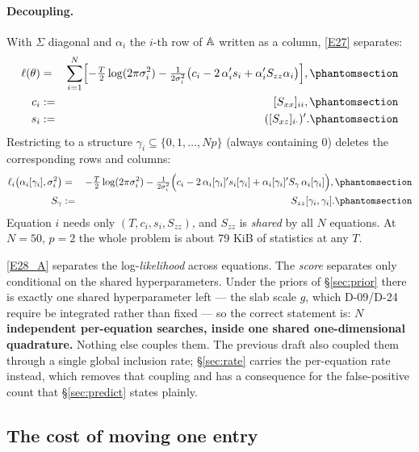 \paragraph{Decoupling.} With $\Sigma$ diagonal and $\alpha_i$ the $i$-th row of $\mathbb{A}$
written as a column, \eqref{E27} separates:
\begin{eqnarray}
\ell(\theta) &=& \sum_{i=1}^{N}\Bigl[-\tfrac{T}{2}\log(2\pi\sigma_i^2)
 - \tfrac{1}{2\sigma_i^2}\bigl(c_i - 2\,\alpha_i' s_i + \alpha_i' S_{zz}\alpha_i\bigr)\Bigr],
  \Elabel{E-28A}{E28_A} \\
c_i &:=& [S_{xx}]_{ii},
  \Elabel{E-28B}{E28_B} \\
s_i &:=& ([S_{xz}]_{i\cdot})'.
  \Elabel{E-28C}{E28_C}
\end{eqnarray}
Restricting to a structure $\gamma_i\subseteq\{0,1,\dots,Np\}$ (always containing 0)
deletes the corresponding rows and columns:
\begin{eqnarray}
\ell_i\bigl(\alpha_i[\gamma_i],\sigma_i^2\bigr) &=& -\tfrac{T}{2}\log(2\pi\sigma_i^2)
 - \tfrac{1}{2\sigma_i^2}\Bigl(c_i - 2\,\alpha_i[\gamma_i]' s_i[\gamma_i]
 + \alpha_i[\gamma_i]' S_\gamma\, \alpha_i[\gamma_i]\Bigr),
  \Elabel{E-29A}{E29_A} \\
S_\gamma &:=& S_{zz}[\gamma_i,\gamma_i].
  \Elabel{E-29B}{E29_B}
\end{eqnarray}
Equation $i$ needs only $(T,c_i,s_i,S_{zz})$, and $S_{zz}$ is \emph{shared} by all
$N$ equations. At $N=50$, $p=2$ the whole problem is about 79 KiB of statistics at
any $T$.

\begin{remark}\label{rem:decouple}
\eqref{E28_A} separates the log-\emph{likelihood} across equations. The \emph{score}
separates only conditional on the shared hyperparameters. Under the priors of
\S\ref{sec:prior} there is exactly one shared hyperparameter left --- the slab scale
$g$, which D-09/D-24 require be integrated rather than fixed --- so the correct
statement is: \textbf{$N$ independent per-equation searches, inside one shared
one-dimensional quadrature.} Nothing else couples them. The previous draft also
coupled them through a single global inclusion rate; \S\ref{sec:rate} carries the
per-equation rate instead, which removes that coupling and has a consequence for the
false-positive count that \S\ref{sec:predict} states plainly.
\end{remark}

\subsection{The cost of moving one entry}

